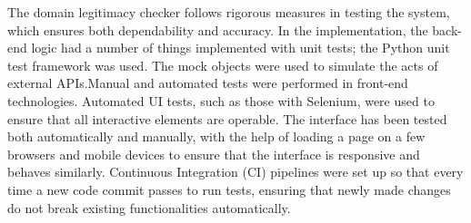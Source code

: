 The domain legitimacy checker follows rigorous measures in testing the system, which ensures both dependability and accuracy. In the implementation, the back-end logic had a number of things implemented with unit tests; the Python unit test framework was used. The mock objects were used to simulate the acts of external APIs.Manual and automated tests were performed in front-end technologies. Automated UI tests, such as those with Selenium, were used to ensure that all interactive elements are operable. The interface has been tested both automatically and manually, with the help of loading a page on a few browsers and mobile devices to ensure that the interface is responsive and behaves similarly. Continuous Integration (CI) pipelines were set up so that every time a new code commit passes to run tests, ensuring that newly made changes do not break existing functionalities automatically. 

